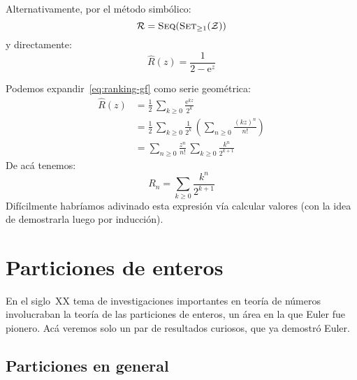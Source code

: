   Alternativamente,
  por el método simbólico:%
  \begin{equation*}
    \mathcal{R}
      = \operatorname{\textsc{Seq}}(\operatorname{\textsc{Set}}_{\ge 1}(\mathcal{Z}))
  \end{equation*}
  y directamente:
  \begin{equation*}
    \widehat{R}(z)
      = \frac{1}{2 - \mathrm{e}^z}
  \end{equation*}

  Podemos expandir~\eqref{eq:ranking-gf} como serie geométrica:
  \begin{align*}
    \widehat{R}(z)
      &= \frac{1}{2} \, \sum_{k \ge 0}
			  \frac{\mathrm{e}^{k z}}{2^k} \\
      &= \frac{1}{2} \, \sum_{k \ge 0}
			  \frac{1}{2^k} \,
			     \left(
			       \sum_{n \ge 0} \frac{(k z)^n}{n!}
			     \right) \\
      &= \sum_{n \ge 0}
	   \frac{z^n}{n!} \,
	   \sum_{k \ge 0}
	     \frac{k^n}{2^{k + 1}}
  \end{align*}
  De acá tenemos:
  \begin{equation}
    \label{eq:ranking-explicit}
    R_n
      = \sum_{k \ge 0} \frac{k^n}{2^{k + 1}}
  \end{equation}
  Difícilmente habríamos adivinado esta expresión
  vía calcular valores
  (con la idea de demostrarla luego por inducción).%

\section{Particiones de enteros}
\label{sec:funciones-generatrices:particiones}

  En el siglo~XX
  tema de investigaciones importantes en teoría de números
  involucraban la teoría de las particiones de enteros,
  un área en la que Euler fue pionero.
  Acá veremos solo un par de resultados curiosos,
  que ya demostró Euler.

\subsection{Particiones en general}
\label{sec:particiones-generales}

